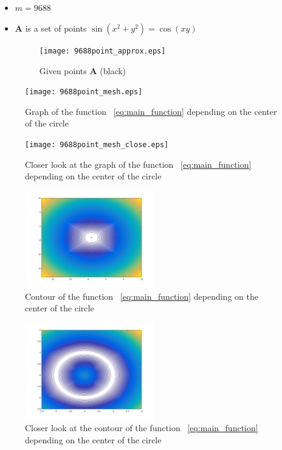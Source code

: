 \documentclass[]{scrartcl}
\begin{document}
 \subsection{}
 \begin{itemize}
 	\item $m = 9688$ 
 	\item $\mathbf{A }$ is a set of points  $\sin(x^2 + y^2) = \cos(xy)$
 	  \begin{figure}[h]
 		\centering
 		\texttt{[image: 9688point\_approx.eps]}
 		\caption{Given points $\mathbf{ A} $ (black)}
 		\label{fig:m9688gd}
 	\end{figure}
 \end{itemize}
 \begin{figure}[h]
 	\centering
 	\texttt{[image: 9688point\_mesh.eps]}
 	\caption{Graph of the function ~\ref{eq:main_function} depending on the center of the circle}
 	\label{fig:m96883d}
 \end{figure}
  \begin{figure}[h]
  	\centering
  	\texttt{[image: 9688point\_mesh\_close.eps]}
  	\caption{Closer look at the graph of the function ~\ref{eq:main_function} depending on the center of the circle}
  	\label{fig:m96883dc}
  \end{figure}
 \begin{figure}[h]
 	\centering
 	\includegraphics[width=0.5\textwidth]{9688point_contour.png}
 	\caption{Contour of the function ~\ref{eq:main_function} depending on the center of the circle}
 	\label{fig:m96882d}
 \end{figure}
  \begin{figure}[h]
  	\centering
  	\includegraphics[width=0.5\textwidth]{9688point_contour_close.png}
  	\caption{Closer look at the  contour of the function ~\ref{eq:main_function} depending on the center of the circle}
  	\label{fig:m96882dc}
  \end{figure}
 
\end{document}
